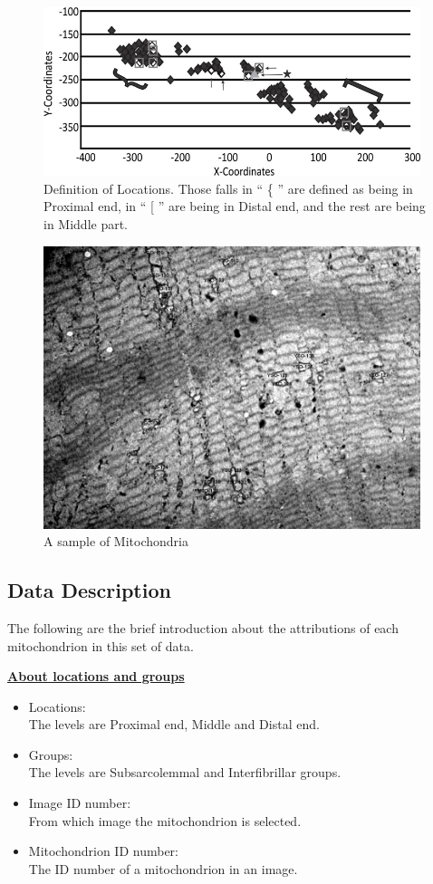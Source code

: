 \documentclass{article}\usepackage[]{graphicx}\usepackage[]{color}
\numberwithin{figure}{subsection} %
\numberwithin{table}{subsection} %
\begin{document}
\bigbreak
\begin{figure}[h!]
  \centering
  \includegraphics [width=11cm, scale=1.5]{location.png}
  \caption{Definition of Locations. Those falls in `` \{ '' are defined as being in Proximal end, in `` [ '' are being in Distal end, and the rest are being in Middle part.}
  \label{location}
\end{figure}

\bigbreak
\bigbreak

\begin{figure}[h!]
  \centering
  \includegraphics [width=11cm, scale=1.5]{mitochondria.png}
  \caption{A sample of Mitochondria}
  \label{mitochondria}
\end{figure}

\clearpage
\subsection{Data Description}
The following are the brief introduction about the attributions of each mitochondrion in this set of data. 

\setlength{\parskip}{0em}
\noindent\textbf{\underline{About locations and groups}}
\begin{itemize}
  \item Locations: \\
  The levels are Proximal end, Middle and Distal end.
  \item Groups: \\
  The levels are Subsarcolemmal and Interfibrillar groups. 
  \item Image ID number: \\
  From which image the mitochondrion is selected. 
  \item Mitochondrion ID number: \\
  The ID number of a mitochondrion in an image. 
\end{itemize}
\end{document}
